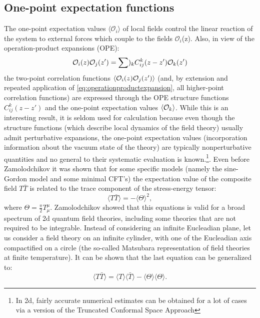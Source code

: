 \subsection{One-point expectation functions}
The one-point expectation values $\langle \mathcal{O}_i\rangle$ of local fields
control the linear reaction of the system to external forces which couple to
the fields $\mathcal{O}_i$(z). Also, in view of the operation-product
expansions (OPE):
\begin{equation}
 \mathcal{O}_i(z)\mathcal{O}_j(z') = \sum)_k C_{ij}^k(z-z')\mathcal{O}_k(z')
 \label{eq:operationproductexpansion}
 \end{equation}
 the two-point correlation functions $\langle \mathcal{O}_i(z)\mathcal{O}_j(z')\rangle$
 (and, by extension and repeated application of
 \eqref{eq:operationproductexpansion}, all higher-point correlation functions)
 are expressed through the OPE structure functions $C_{ij}^k(z-z')$ and the
 one-point expectation values $\langle\mathcal{O}_k\rangle$. While this is an
 interesting result, it is seldom used for calculation because even though the
 structure functions (which describe local dynamics of the field theory)
 usually admit perturbative expansions, the one-point expectation values
 (incorporation information about the vacuum state of the theory) are
 typically nonperturbative quantities and no general to their systematic
 evaluation is known.\footnote{In 2d, fairly accurate numerical estimates can
   be  obtained for a lot of cases via a version of the Truncated Conformal
 Space Approach}. Even before Zamolodchikov it was shown that for some specific
 models (namely the sine-Gordon model and some minimal CFT's) the expectation
 value of the composite field $T\bar{T}$ is related to the trace component of
 the  stress-energy tensor:
 \begin{equation}
   \langle T\bar{T}\rangle = -\langle \Theta \rangle^2,
   \label{eq:specifictt}
 \end{equation}
 where $\Theta = \frac{\pi}{2}T^\mu_\mu$.
 Zamolodchikov showed that this equations is valid for a broad spectrum of 2d
 quantum field theories, including some theories that are not required to be
 integrable. Instead of considering an infinite Eucleadian plane, let us
 consider a field theory on an infinite cylinder, with one of the Eucleadian
 axis compactified on a circle (the so-called Matsubara representation of field
 theories at finite temperature). It can be shown that the last equation can be
 generalized to:
 \begin{equation}
   \langle T\bar{T}\rangle = \langle T\rangle \langle \bar{T}\rangle
   - \langle{\Theta}\rangle\langle\Theta\rangle.
   \label{eq:generaltt}
 \end{equation}
